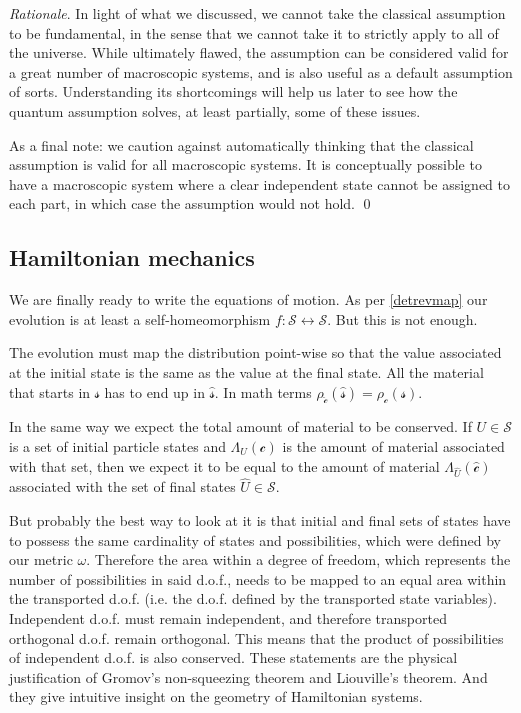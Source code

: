 \documentclass[aps,pra,10pt,twocolumn,floatfix,nofootinbib]{revtex4-1}
\numberwithin{equation}{section}
\theoremstyle{definition}
\newenvironment{rationale}{\emph{Rationale}.}{\qed}
\begin{document}
\begin{rationale}
	In light of what we discussed, we cannot take the classical assumption to be fundamental, in the sense that we cannot take it to strictly apply to all of the universe. While ultimately flawed, the  assumption can be considered valid for a great number of macroscopic systems, and is also useful as a default assumption of sorts. Understanding its shortcomings will help us later to see how the quantum assumption solves, at least partially, some of these issues.
	
	As a final note: we caution against automatically thinking that the classical assumption is valid for all macroscopic systems. It is conceptually possible to have a macroscopic system where a clear independent state cannot be assigned to each part, in which case the assumption would not hold.
\end{rationale}


\subsection{Hamiltonian mechanics}

We are finally ready to write the equations of motion. As per \ref{detrevmap} our evolution is at least a self-homeomorphism $f:\mathcal{S} \leftrightarrow \mathcal{S}$. But this is not enough.

The evolution must map the distribution point-wise so that the value associated at the initial state is the same as the value at the final state. All the material that starts in $\mathcal{s}$ has to end up in $\hat{\mathcal{s}}$. In math terms $\rho_{\hat{\mathcal{c}}} (\hat{\mathcal{s}}) = \rho_\mathcal{c}(\mathcal{s})$.

In the same way we expect the total amount of material to be conserved. If $U \in \mathcal{S}$ is a set of initial particle states and $\Lambda_U(\mathcal{c})$ is the amount of material associated with that set, then we expect it to be equal to the amount of material $\Lambda_{\hat{U}}(\hat{\mathcal{c}})$ associated with the set of final states $\hat{U} \in \mathcal{S}$.

But probably the best way to look at it is that initial and final sets of states have to possess the same cardinality of states and possibilities, which were defined by our metric $\omega$. Therefore the area within a degree of freedom, which represents the number of possibilities in said d.o.f., needs to be mapped to an equal area within the transported d.o.f. (i.e. the d.o.f. defined by the transported state variables). Independent d.o.f. must remain independent, and therefore transported orthogonal d.o.f. remain orthogonal. This means that the product of possibilities of independent d.o.f. is also conserved. These statements are the physical justification of Gromov's non-squeezing theorem and Liouville's theorem. And they give intuitive insight on the geometry of Hamiltonian systems.
\end{document}

